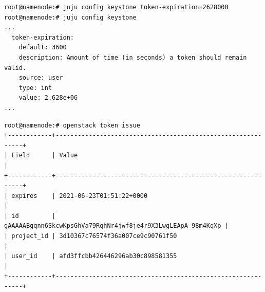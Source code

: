 \documentclass[11pt,a4paper]{article}
\begin{document}
\begin{lstlisting}[]
root@namenode:# juju config keystone token-expiration=2628000
root@namenode:# juju config keystone
...
  token-expiration:
    default: 3600
    description: Amount of time (in seconds) a token should remain valid.
    source: user
    type: int
    value: 2.628e+06
...
\end{lstlisting}
\begin{lstlisting}[]
root@namenode:# openstack token issue
+------------+-------------------------------------------------------------+
| Field      | Value                                                       |
+------------+-------------------------------------------------------------+
| expires    | 2021-06-23T01:51:22+0000                                    |
| id         | gAAAAABgqnn6SkcwKpsGhVa79RqhNr4jwf8je4r9X3LwgLEApA_98m4KqXp |
| project_id | 3d10367c76574f36a007ce9c90761f50                            |
| user_id    | afd3ffcbb426446296ab30c898581355                            |
+------------+-------------------------------------------------------------+
\end{lstlisting}
\end{document}

